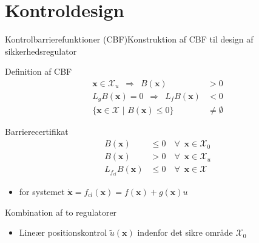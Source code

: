 \section{Kontroldesign}
\begin{frame}{Kontrolbarrierefunktioner (CBF)}{Konstruktion af CBF til design af sikkerhedsregulator}
	\vspace{3mm}
\begin{minipage}[b]{0.5\linewidth}
	\begin{block}{Definition af CBF}
		\vspace{-5mm}
		\begin{align*}
		\mathbf{x}\in\mathcal{X}_u \,\,\, \Rightarrow\,\,\, B(\mathbf{x})&>0\\
		L_gB(\mathbf{x})=0 \,\,\,\Rightarrow\,\,\, L_fB(\mathbf{x})&<0\\
		\{\mathbf{x}\in\mathcal{X}\,\,|\,\,B(\mathbf{x})\leq 0 \} &\neq \emptyset
		\end{align*}
	\end{block}
\end{minipage}
\hspace{4mm}
\begin{minipage}[b]{0.35\linewidth}
	\begin{block}{Barrierecertifikat}
		\vspace{-5mm}
		\begin{align*}
		B(\mathbf{x})&\leq 0 \quad \forall\,\,\,\mathbf{x}\in\mathcal{X}_0\\
		B(\mathbf{x})&> 0 \quad \forall\,\,\,\mathbf{x}\in\mathcal{X}_u\\
		L_{f_{cl}}B(\mathbf{x})&\leq 0 \quad \forall\,\,\,\mathbf{x}\in\mathcal{X}
		\end{align*}
	\end{block}
\end{minipage}
\vspace{-2mm}
\begin{itemize}
	\item for systemet $\dot{\mathbf{x}}=f_{cl}(\mathbf{x})=f(\mathbf{x})+g(\mathbf{x})u$
\end{itemize}
\vspace{4mm}
\begin{block}{Kombination af to regulatorer}
	\begin{itemize}
		\item Lineær positionskontrol $\tilde{u}(\mathbf{x})$ indenfor det sikre område $\mathcal{X}_0$

\end{itemize}
\end{block}
\end{frame}
